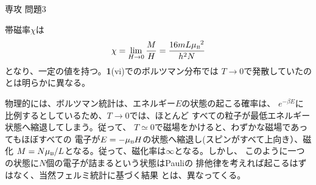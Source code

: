 \documentclass[fleqn]{jbook}
\begin{document}
\begin{answer}{専攻 問題3}{}
\begin{subanswers}
\begin{subsubanswers}
  \SubSubAnswer
    帯磁率$\chi$は
%
    \[ \chi = \lim_{H\to 0}\frac{M}{H} = \frac{16mL\muB^2}{h^2N} \]
%
    となり、一定の値を持つ。{\bf 1}(vi)でのボルツマン分布では
    $T\to 0$で発散していたのとは明らかに異なる。

    物理的には、ボルツマン統計は、エネルギー$E$の状態の起こる確率は、
    $e^{-\beta E}$に比例するとしているため、$T\to 0$では、ほとんど
    すべての粒子が最低エネルギー状態へ縮退してしまう。従って、
    $T\simeq 0$で磁場をかけると、わずかな磁場であってもほぼすべての
    電子が$E=-\muB H$の状態へ縮退し(スピンがすべて上向き）、磁化
    $M=N\muB/L$となる。従って、磁化率は$\infty$となる。しかし、
    このように一つの状態に$N$個の電子が詰まるという状態はPauliの
    排他律を考えれば起こるはずはなく、当然フェルミ統計に基づく結果
    とは、異なってくる。

  \end{subsubanswers}
\end{subanswers}

\end{answer}
\end{document}
